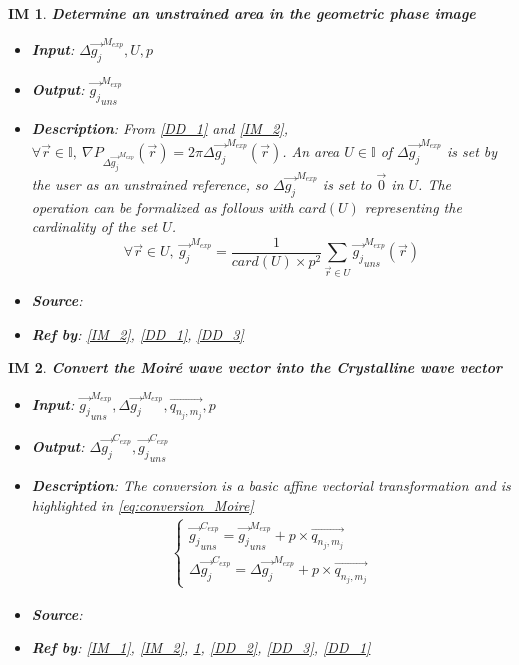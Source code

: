 \documentclass[12pt]{article}
\newtheorem{IM}{IM}
\begin{document}
\begin{IM}
\label{IM_3}
\noindent\colorbox{shadecolorIM}{\normalfont \textbf{Determine an unstrained area in the geometric phase image}}
\normalfont
\begin{itemize}
\item \textbf{Input}: $\Delta \overrightarrow{g_{j}}^{M_{exp}},U,p$
\item \textbf{Output}: $\overrightarrow{g_{j}}_{uns}^{M_{exp}}$
\item \textbf{Description}: From \cref{DD_1} and \cref{IM_2}, $\forall \vec{r} \in \mathbb{I},\  \nabla P_{\Delta \overrightarrow{g_{j}}^{M_{exp}}} (\vec{r}) = 2\pi \Delta \overrightarrow{g_{j}}^{M_{exp}}(\vec{r})$. An area $U \in \mathbb{I}$ of $\Delta \overrightarrow{g_{j}}^{M_{exp}}$ is set by the user as an unstrained reference, so $\Delta \overrightarrow{g_{j}}^{M_{exp}}$ is set to $\overrightarrow{0}$ in $U$. The operation can be formalized as follows with $card(U)$ representing the cardinality of the set $U$.
\begin{equation}
\forall \vec{r} \in U, \ \overrightarrow{g_{j}}^{M_{exp}}=\frac{1}{card(U)\times p^2}\sum_{\vec{r}\in U}\overrightarrow{g_{j}}_{uns}^{M_{exp}}(\vec{r})
\end{equation}
\item \textbf{Source}: \cite{Hytch1998}
\item \textbf{Ref by}: \cref{IM_2}, \cref{DD_1}, \cref{DD_3}
\end{itemize}
\end{IM}

\begin{IM}
\label{IM_4}
\noindent\colorbox{shadecolorIM}{\normalfont \textbf{Convert the Moir{\'e} wave vector into the Crystalline wave vector}}
\normalfont
\begin{itemize}
\item \textbf{Input}: $\overrightarrow{g_{j}}_{uns}^{M_{exp}},\Delta \overrightarrow{g_{j}}^{M_{exp}},\overrightarrow{q_{n_j,m_j}},p$
\item \textbf{Output}: $\Delta \overrightarrow{g_{j}}^{C_{exp}},\overrightarrow{g_{j}}_{uns}^{C_{exp}}$
\item \textbf{Description}: The conversion is a basic affine vectorial transformation and is highlighted in \cref{eq:conversion_Moire}
\begin{equation}
\label{eq:conversion_Moire}
\begin{gathered}
\begin{cases}
\overrightarrow{g_{j}}_{uns}^{C_{exp}}= \overrightarrow{g_{j}}_{uns}^{M_{exp}} + p \times \overrightarrow{q_{n_j,m_j}} \\
\Delta \overrightarrow{g_{j}}^{C_{exp}}= \Delta \overrightarrow{g_{j}}^{M_{exp}} + p \times \overrightarrow{q_{n_j,m_j}}
\end{cases}
\end{gathered}
\end{equation}
\item \textbf{Source}: \cite{Pofelski2017}
\item \textbf{Ref by}: \cref{IM_1}, \cref{IM_2}, \cref{IM_3}, \cref{DD_2}, \cref{DD_3}, \cref{DD_1}
\end{itemize}
\end{IM}
\end{document}
